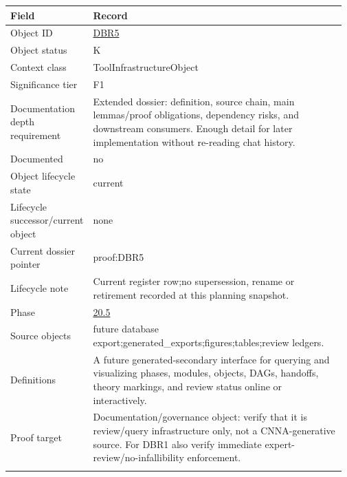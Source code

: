 \begin{longtable}{L{0.16\linewidth} L{0.81\linewidth}}
\hline
\textbf{Field} & \textbf{Record}\\
\hline
Object ID & \hyperlink{object-row-DBR5}{DBR5}\\
\hline\addlinespace[0.20em]
Object status & K\\
\hline\addlinespace[0.20em]
Context class & ToolInfrastructureObject\\
\hline\addlinespace[0.20em]
Significance tier & F1\\
\hline\addlinespace[0.20em]
Documentation depth requirement & Extended dossier: definition, source chain, main lemmas/\allowbreak{}proof obligations, dependency risks, and downstream consumers. Enough detail for later implementation without re-reading chat history.\\
\hline\addlinespace[0.20em]
Documented & no\\
\hline\addlinespace[0.20em]
Object lifecycle state & current\\
\hline\addlinespace[0.20em]
Lifecycle successor/\allowbreak{}current object & none\\
\hline\addlinespace[0.20em]
Current dossier pointer & proof:DBR5\\
\hline\addlinespace[0.20em]
Lifecycle note & Current register row;\newline no supersession, rename or retirement recorded at this planning snapshot.\\
\hline\addlinespace[0.20em]
Phase & \hyperlink{phase-row-20-5}{20.5}\\
\hline\addlinespace[0.20em]
Source objects & future database export;\newline generated\_exports;\newline figures;\newline tables;\newline review ledgers.\\
\hline\addlinespace[0.20em]
Definitions & A future generated-secondary interface for querying and visualizing phases, modules, objects, DAGs, handoffs, theory markings, and review status online or interactively.\\
\hline\addlinespace[0.20em]
Proof target & Documentation/\allowbreak{}governance object: verify that it is review/\allowbreak{}query infrastructure only, not a CNNA-generative source. For DBR1 also verify immediate expert-review/\allowbreak{}no-infallibility enforcement.\\
\hline\addlinespace[0.20em]

\end{longtable}
